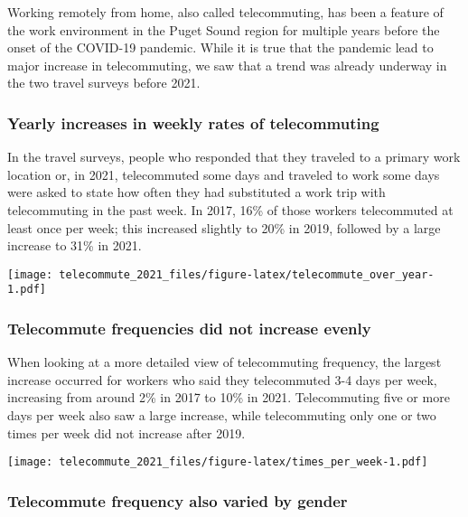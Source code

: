 \documentclass[
  12pt,
]{article}
\begin{document}
\begin{flushleft}
Working remotely from home, also called telecommuting, has been a feature of the work environment in the Puget Sound region for multiple years before the onset of the COVID-19 pandemic. While it is true that the pandemic lead to major increase in telecommuting, we saw that a trend was already underway in the two travel surveys before 2021.
\end{flushleft}

\hypertarget{yearly-increases-in-weekly-rates-of-telecommuting}{%
\subsubsection{Yearly increases in weekly rates of
telecommuting}\label{yearly-increases-in-weekly-rates-of-telecommuting}}

\begin{flushleft}
In the travel surveys, people who responded that they traveled to a primary work location or, in 2021, telecommuted some days and traveled to work some days were asked to state how often they had substituted a work trip with telecommuting in the past week. In 2017, 16\% of those workers telecommuted at least once per week; this increased slightly to 20\% in 2019, followed by a large increase to 31\% in 2021.
\end{flushleft}

\texttt{[image: telecommute\_2021\_files/figure-latex/telecommute\_over\_year-1.pdf]}

\hypertarget{telecommute-frequencies-did-not-increase-evenly}{%
\subsubsection{Telecommute frequencies did not increase
evenly}\label{telecommute-frequencies-did-not-increase-evenly}}

\begin{flushleft}
When looking at a more detailed view of telecommuting frequency, the largest increase occurred for workers who said they telecommuted 3-4 days per week, increasing from around 2\% in 2017 to 10\% in 2021. Telecommuting five or more days per week also saw a large increase, while telecommuting only one or two times per week did not increase after 2019.
\end{flushleft}

\texttt{[image: telecommute\_2021\_files/figure-latex/times\_per\_week-1.pdf]}

\hypertarget{telecommute-frequency-also-varied-by-gender}{%
\subsubsection{Telecommute frequency also varied by
gender}\label{telecommute-frequency-also-varied-by-gender}}
\end{document}
